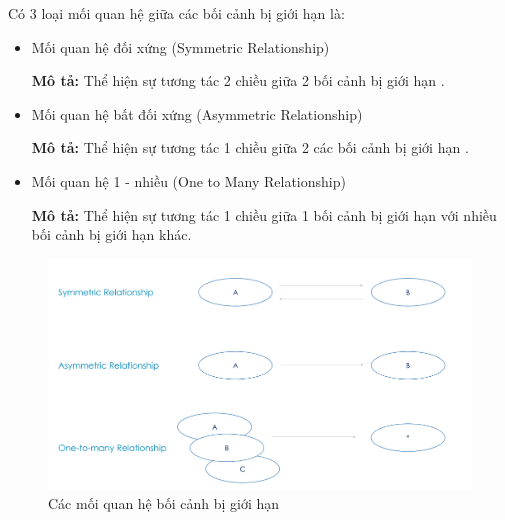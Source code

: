 Có 3 loại mối quan hệ giữa các bối cảnh bị giới hạn là:

\begin{itemize}

\item Mối quan hệ đối xứng (Symmetric Relationship)

\textbf{Mô tả:} Thể hiện sự tương tác 2 chiều giữa 2 bối cảnh bị giới hạn .

\item Mối quan hệ bất đối xứng (Asymmetric Relationship)

\textbf{Mô tả:} Thể hiện sự tương tác 1 chiều giữa 2 các bối cảnh bị giới hạn .

\item Mối quan hệ 1 - nhiều (One to Many Relationship)

\textbf{Mô tả:} Thể hiện sự tương tác 1 chiều giữa 1 bối cảnh bị giới hạn với nhiều bối cảnh bị giới hạn khác.

\end{itemize}

\begin{figure}[H]

\centering

\includegraphics[scale = 0.5]{pictures/cac_moi_quan_he_boi_canh_gioi_han/main.png}

\caption{Các mối quan hệ bối cảnh bị giới hạn}

\end{figure}

